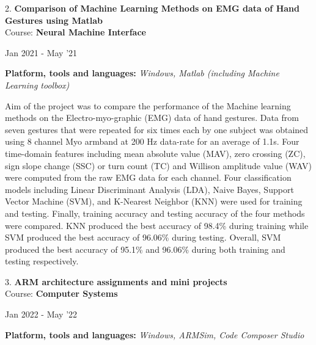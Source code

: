 \documentclass[10pt]{article}
\newenvironment{innerlist}[1][\enskip\textbullet]%
        {\begin{compactitem}[#1]}{\end{compactitem}}
\newenvironment{loneinnerlist}[1][\enskip\textbullet]%
        {\vspace{-\baselineskip}\begin{compactitem}[#1]}
        {\end{compactitem}\vspace{-.6\baselineskip}}
\begin{document}
\begin{loneinnerlist}
\begin{loneinnerlist}
\item[2.]\textbf{Comparison of Machine Learning Methods on EMG data of Hand Gestures using Matlab} \\ 
\vspace{4pt}
Course: \textbf{Neural Machine Interface} \\
\vspace*{-28pt} \begin{flushright} Jan 2021 - May '21 \end{flushright}
\textbf{Platform, tools and languages:} \emph{Windows, Matlab (including Machine Learning toolbox)} 
\vspace*{2pt}
\begin{innerlist} \item Aim of the project was to compare the performance of the Machine learning methods on the Electro-myo-graphic (EMG) data of hand gestures. Data from seven gestures that were repeated for six times each by one subject was obtained using 8 channel Myo armband at 200 Hz data-rate for an average of 1.1s. Four time-domain features including mean absolute value (MAV), zero crossing (ZC), sign slope change (SSC) or turn count (TC) and Willison amplitude value (WAV) were computed from the raw EMG data for each channel. Four classification models including Linear Discriminant Analysis (LDA), Naive Bayes, Support Vector Machine (SVM), and K-Nearest Neighbor (KNN) were used for training and testing. Finally, training accuracy  and testing accuracy of the four methods were compared. KNN produced the best accuracy of 98.4\% during training while SVM produced the best accuracy of 96.06\% during testing. Overall, SVM produced the best accuracy of 95.1\% and 96.06\% during both training and testing respectively.
\end{innerlist}  \vspace*{6pt}

\item[3.]\textbf{ ARM architecture assignments and mini projects} \\ 
\vspace{4pt}
Course: \textbf{Computer Systems} \\
\vspace*{-28pt} \begin{flushright} Jan 2022 - May '22 \end{flushright}
\textbf{Platform, tools and languages:} \emph{Windows, ARMSim, Code Composer Studio} 


\end{loneinnerlist}
\end{loneinnerlist}
\end{document}
